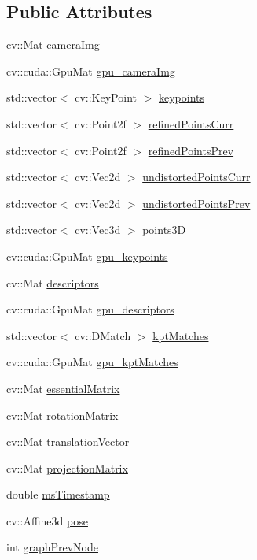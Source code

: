 \subsection*{Public Attributes}
\begin{DoxyCompactItemize}
\item 
cv\+::\+Mat \hyperlink{structDataFrame_ae3261fcdeb3b39c1a4b09bb0c8ce552e}{camera\+Img}
\item 
cv\+::cuda\+::\+Gpu\+Mat \hyperlink{structDataFrame_aca2cdb1fd8ac19b72f29b98157bedf8a}{gpu\+\_\+camera\+Img}
\item 
std\+::vector$<$ cv\+::\+Key\+Point $>$ \hyperlink{structDataFrame_a88fb91bb47cdddd284f2587517856592}{keypoints}
\item 
std\+::vector$<$ cv\+::\+Point2f $>$ \hyperlink{structDataFrame_a2377e8ea584d7e9c1b8207a376cb3ef9}{refined\+Points\+Curr}
\item 
std\+::vector$<$ cv\+::\+Point2f $>$ \hyperlink{structDataFrame_a6dca2985cb4577dc2c672ca027529742}{refined\+Points\+Prev}
\item 
std\+::vector$<$ cv\+::\+Vec2d $>$ \hyperlink{structDataFrame_a47ffc5d8bf594c79163db6c764dc0705}{undistorted\+Points\+Curr}
\item 
std\+::vector$<$ cv\+::\+Vec2d $>$ \hyperlink{structDataFrame_a3725f099035634c1ece2fbdb4dd97256}{undistorted\+Points\+Prev}
\item 
std\+::vector$<$ cv\+::\+Vec3d $>$ \hyperlink{structDataFrame_a1f7311869470a28ac444a9a502b8e5bf}{points3D}
\item 
cv\+::cuda\+::\+Gpu\+Mat \hyperlink{structDataFrame_a2aad6b25c4eec875828841836d69de42}{gpu\+\_\+keypoints}
\item 
cv\+::\+Mat \hyperlink{structDataFrame_aac052b3b741459a8ef04bd768e5e27fa}{descriptors}
\item 
cv\+::cuda\+::\+Gpu\+Mat \hyperlink{structDataFrame_ad2f1e5de380262c6699ef3d674e60005}{gpu\+\_\+descriptors}
\item 
std\+::vector$<$ cv\+::\+D\+Match $>$ \hyperlink{structDataFrame_af551ce74f7dbaa40295c6903c7732dcb}{kpt\+Matches}
\item 
cv\+::cuda\+::\+Gpu\+Mat \hyperlink{structDataFrame_a1b1ff5cf6666f4492af7f4c050a7784e}{gpu\+\_\+kpt\+Matches}
\item 
cv\+::\+Mat \hyperlink{structDataFrame_a04ff1b0f75d65e07490ed8dc24e7e664}{essential\+Matrix}
\item 
cv\+::\+Mat \hyperlink{structDataFrame_afefff04de405c6db0ebc4ed8650b7dfc}{rotation\+Matrix}
\item 
cv\+::\+Mat \hyperlink{structDataFrame_aeda6ec8df72a8df16e984f232b5a27cd}{translation\+Vector}
\item 
cv\+::\+Mat \hyperlink{structDataFrame_a233802c3a35ca0fbee513fab39ee7104}{projection\+Matrix}
\item 
double \hyperlink{structDataFrame_a25ec037466975cee2072b0922effc7f8}{ms\+Timestamp}
\item 
cv\+::\+Affine3d \hyperlink{structDataFrame_a6928232a02166e60d50ef4d551b57d01}{pose}
\item 
int \hyperlink{structDataFrame_a4ca6fd1603f296d7a050f8d47d4ff7a5}{graph\+Prev\+Node}
\end{DoxyCompactItemize}


